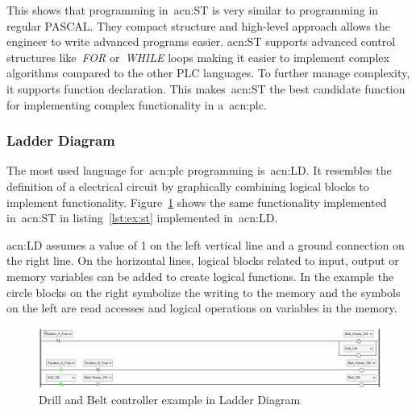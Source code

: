 This shows that programming in~\acrshort{acn:ST} is very similar to programming in regular PASCAL.
They compact structure and high-level approach allows the engineer to write advanced programs easier.
\acrshort{acn:ST} supports advanced control structures like~\textit{FOR} or~\textit{WHILE} loops making it easier to implement complex algorithms compared to the other PLC languages. 
To further manage complexity, it supports function declaration.
This makes~\acrshort{acn:ST} the best candidate function for implementing complex functionality in a~\acrshort{acn:plc}.

\subsubsection{Ladder Diagram}

The most used language for~\acrshort{acn:plc} programming is~\acrfull{acn:LD}.
It resembles the definition of a electrical circuit by graphically combining logical blocks to implement functionality.
Figure~\ref{fig:drill:ld} shows the same functionality implemented in~\acrshort{acn:ST} in listing~\ref{lst:ex:st} implemented in~\acrshort{acn:LD}.

\acrshort{acn:LD} assumes a value of 1 on the left vertical line and a ground connection on the right line.
On the horizontal lines, logical blocks related to input, output or memory variables can be added to create logical functions.
In the example the circle blocks on the right symbolize the writing to the memory and the symbols on the left are read accesses and logical operations on variables in the memory.


\begin{figure}
	\includegraphics[width=\textwidth]{Figures/belt_drill_ld.png}
	\caption[Drill and Belt controller example in Ladder Diagram]{Drill and Belt controller example in Ladder Diagram}
	\label{fig:drill:ld}
\end{figure}
